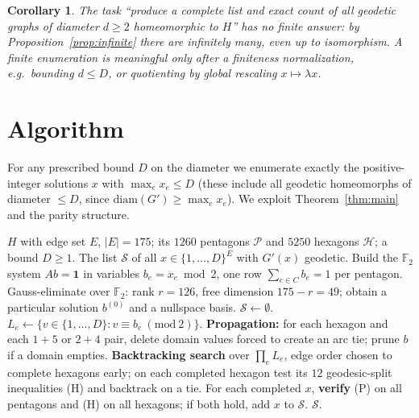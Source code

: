 \documentclass{amsart}
\newtheorem{corollary}{Corollary}
\theoremstyle{definition}
\begin{document}
\begin{corollary}\label{cor:illposed}
The task ``produce a complete list and exact \emph{count} of all geodetic graphs
of diameter $d\ge2$ homeomorphic to $H$'' has no finite answer: by
Proposition~\ref{prop:infinite} there are infinitely many, even up to
isomorphism. A finite enumeration is meaningful only after a finiteness
normalization, e.g.\ bounding $d\le D$, or quotienting by global rescaling
$x\mapsto\lambda x$.
\end{corollary}

\section{Algorithm}

For any prescribed bound $D$ on the diameter we enumerate exactly the
positive-integer solutions $x$ with $\max_e x_e\le D$ (these include all geodetic
homeomorphs of diameter $\le D$, since $\mathrm{diam}(G')\ge\max_e x_e$). We
exploit Theorem~\ref{thm:main} and the parity structure.

\begin{algorithm}[H]
\caption{Enumerate geodetic homeomorphs of $H$ with $\max_e x_e\le D$}
\begin{algorithmic}[1]
\Require $H$ with edge set $E$, $|E|=175$; its $1260$ pentagons $\mathcal P$ and
$5250$ hexagons $\mathcal H$; a bound $D\ge1$.
\Ensure The list $\mathcal S$ of all $x\in\{1,\dots,D\}^E$ with $G'(x)$ geodetic.
\State Build the $\mathbb F_2$ system $Ab=\mathbf 1$ in variables
$b_e=x_e\bmod2$, one row $\sum_{e\in C}b_e=1$ per pentagon.
\State Gauss-eliminate over $\mathbb F_2$: rank $r=126$, free dimension
$175-r=49$; obtain a particular solution $b^{(0)}$ and a nullspace basis.
\State $\mathcal S\gets\emptyset$.
  \State $L_e\gets\{v\in\{1,\dots,D\}:v\equiv b_e\ (\mathrm{mod}\ 2)\}$.
  \State \textbf{Propagation:} for each hexagon and each $1{+}5$ or $2{+}4$ pair,
  delete domain values forced to create an arc tie; prune $b$ if a domain empties.
  \State \textbf{Backtracking search} over $\prod_e L_e$, edge order chosen to
  complete hexagons early; on each completed hexagon test its $12$
  geodesic-split inequalities (H) and backtrack on a tie.
  \State For each completed $x$, \textbf{verify} (P) on all pentagons and (H) on
  all hexagons; if both hold, add $x$ to $\mathcal S$.
\EndFor
\State \Return $\mathcal S$.
\end{algorithmic}
\end{algorithm}
\end{document}
